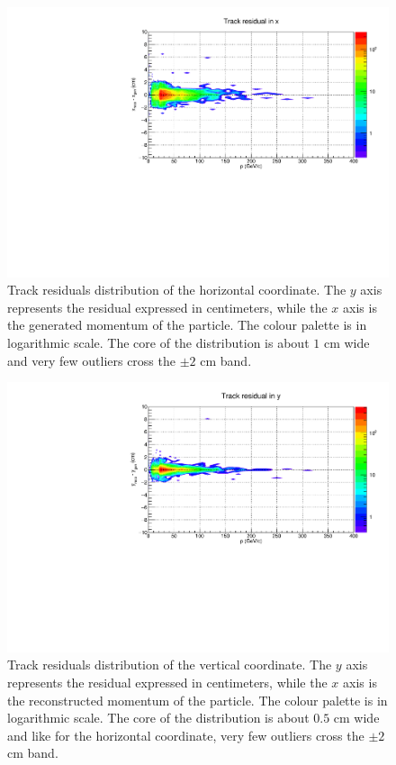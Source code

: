 \begin{figure}[!ht]
\begin{center}
\includegraphics[width=0.99\linewidth]{Chapters/O2/Figs/TRx.pdf}
\caption{Track residuals distribution of the horizontal coordinate. The $y$ axis represents the residual expressed in centimeters, while the $x$ axis is the generated momentum of the particle. The colour palette is in logarithmic scale.
The core of the distribution is about $1$ cm wide and very few outliers cross the $\pm2$ cm band.}
\label{fig:MID_xpoint_x}
\end{center}
\end{figure}

\begin{figure}[!ht]
\begin{center}
\includegraphics[width=0.99\linewidth]{Chapters/O2/Figs/TRy.pdf}
\caption{Track residuals distribution of the vertical coordinate. The $y$ axis represents the residual expressed in centimeters, while the $x$ axis is the reconstructed momentum of the particle. The colour palette is in logarithmic scale.
The core of the distribution is about $0.5$ cm wide and like for the horizontal coordinate, very few outliers cross the $\pm2$ cm band.}
\label{fig:MID_xpoint_y}
\end{center}
\end{figure}

